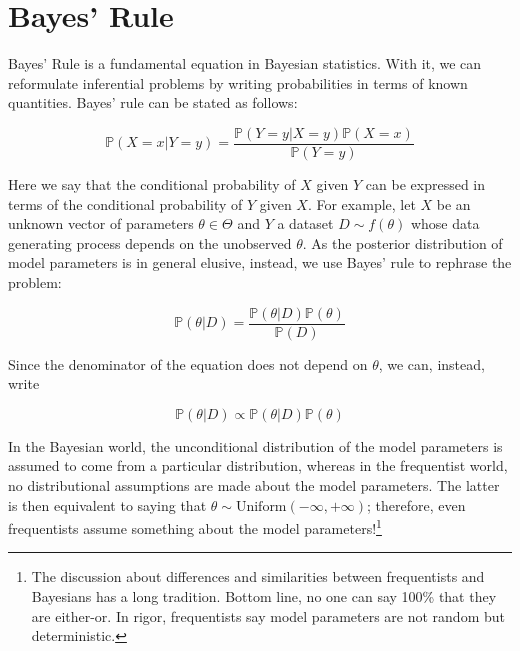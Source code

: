 \documentclass[]{book}
\begin{document}
\hypertarget{bayes-rule}{%
\chapter{Bayes' Rule}\label{bayes-rule}}

Bayes' Rule is a fundamental equation in Bayesian statistics. With it, we can reformulate inferential problems by writing probabilities in terms of known quantities. Bayes' rule can be stated as follows:

\begin{equation}
\mathbb{P}{\left(X=x|Y=y\right)} = \frac{\mathbb{P}{\left(Y=y|X=y\right)}\mathbb{P}{\left(X=x\right)}}{\mathbb{P}{\left(Y=y\right)}}
\end{equation}

Here we say that the conditional probability of \(X\) given \(Y\) can be expressed in terms of the conditional probability of \(Y\) given \(X\). For example, let \(X\) be an unknown vector of parameters \(\theta\in\Theta\) and \(Y\) a dataset \(D \sim f(\theta)\) whose data generating process depends on the unobserved \(\theta\). As the posterior distribution of model parameters is in general elusive, instead, we use Bayes' rule to rephrase the problem:

\begin{equation*}
\mathbb{P}{\left(\theta|D\right)} = \frac{\mathbb{P}{\left(\theta|D\right)}\mathbb{P}{\left(\theta\right)}}{\mathbb{P}{\left(D\right)}}
\end{equation*}

Since the denominator of the equation does not depend on \(\theta\), we can, instead, write

\begin{equation*}
\mathbb{P}{\left(\theta|D\right)} \propto \mathbb{P}{\left(\theta|D\right)}\mathbb{P}{\left(\theta\right)}
\end{equation*}

In the Bayesian world, the unconditional distribution of the model parameters is assumed to come from a particular distribution, whereas in the frequentist world, no distributional assumptions are made about the model parameters. The latter is then equivalent to saying that \(\theta\sim \mbox{Uniform}(-\infty, +\infty)\); therefore, even frequentists assume something about the model parameters!\footnote{The discussion about differences and similarities between frequentists and Bayesians has a long tradition. Bottom line, no one can say 100\% that they are either-or. In rigor, frequentists say model parameters are not random but deterministic.}
\end{document}
